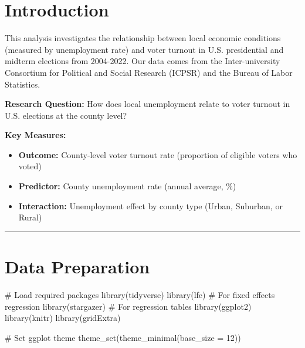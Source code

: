 \documentclass[
  11pt,
]{article}
\newenvironment{Shaded}{\begin{snugshade}}{\end{snugshade}}
\newcommand{\AttributeTok}[1]{\textcolor[rgb]{0.40,0.45,0.13}{#1}}
\newcommand{\CommentTok}[1]{\textcolor[rgb]{0.37,0.37,0.37}{#1}}
\newcommand{\DecValTok}[1]{\textcolor[rgb]{0.68,0.00,0.00}{#1}}
\newcommand{\FunctionTok}[1]{\textcolor[rgb]{0.28,0.35,0.67}{#1}}
\newcommand{\NormalTok}[1]{\textcolor[rgb]{0.00,0.23,0.31}{#1}}
\providecommand{\tightlist}{%
  \setlength{\itemsep}{0pt}\setlength{\parskip}{0pt}}
\begin{document}
\section{Introduction}\label{introduction}

This analysis investigates the relationship between local economic
conditions (measured by unemployment rate) and voter turnout in U.S.
presidential and midterm elections from 2004-2022. Our data comes from
the Inter-university Consortium for Political and Social Research
(ICPSR) and the Bureau of Labor Statistics.

\textbf{Research Question:} How does local unemployment relate to voter
turnout in U.S. elections at the county level?

\textbf{Key Measures:}

\begin{itemize}
\tightlist
\item
  \textbf{Outcome:} County-level voter turnout rate (proportion of
  eligible voters who voted)
\item
  \textbf{Predictor:} County unemployment rate (annual average, \%)
\item
  \textbf{Interaction:} Unemployment effect by county type (Urban,
  Suburban, or Rural)
\end{itemize}

\begin{center}\rule{0.5\linewidth}{0.5pt}\end{center}

\section{Data Preparation}\label{data-preparation}

\begin{Shaded}
\begin{Highlighting}[]
\CommentTok{\# Load required packages}
\FunctionTok{library}\NormalTok{(tidyverse)}
\FunctionTok{library}\NormalTok{(lfe)           }\CommentTok{\# For fixed effects regression}
\FunctionTok{library}\NormalTok{(stargazer)     }\CommentTok{\# For regression tables}
\FunctionTok{library}\NormalTok{(ggplot2)}
\FunctionTok{library}\NormalTok{(knitr)}
\FunctionTok{library}\NormalTok{(gridExtra)}

\CommentTok{\# Set ggplot theme}
\FunctionTok{theme\_set}\NormalTok{(}\FunctionTok{theme\_minimal}\NormalTok{(}\AttributeTok{base\_size =} \DecValTok{12}\NormalTok{))}
\end{Highlighting}
\end{Shaded}
\end{document}

